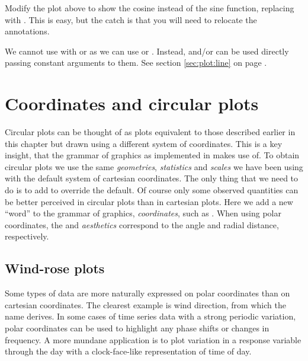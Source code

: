 \documentclass[krantz2]{krantz}\usepackage{knitr}
\begin{document}
\begin{playground}
Modify the plot above to show the cosine instead of the sine function, replacing  with . This is easy, but the catch is that you will need to relocate the annotations.
\end{playground}

\begin{infobox}
We cannot use  with  or  as we can use  or . Instead,  and/or   can be used directly passing constant arguments to them. See section \ref{sec:plot:line} on page \pageref{sec:plot:vhline}.
\end{infobox}

\section{Coordinates and circular plots}\label{sec:plot:circular}\label{sec:plot:coord}
Circular plots can be thought of as plots equivalent to those described earlier in this chapter but drawn using a different system of coordinates. This is a key insight, that the grammar of graphics as implemented in \ggplot makes use of. To obtain circular plots we use the same \emph{geometries}, \emph{statistics} and \emph{scales} we have been using with the default system of cartesian coordinates. The only thing that we need to do is to add  to override the default. Of course only some observed quantities can be better perceived in circular plots than in cartesian plots. Here we add a new ``word'' to the grammar of graphics, \textit{coordinates}, such as .
When using polar coordinates, the  and  \textit{aesthetics} correspond to the angle and radial distance, respectively.

\subsection{Wind-rose plots}
Some types of data are more naturally expressed on polar coordinates than on cartesian coordinates. The clearest example is wind direction, from which the name derives. In some cases of time series data with a strong periodic variation, polar coordinates can be used to highlight any phase shifts or changes in frequency. A more mundane application is to plot variation in a response variable through the day with a clock-face-like representation of time of day.
\end{document}
